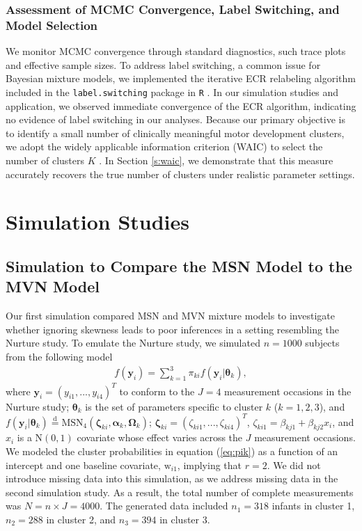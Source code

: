 \documentclass[useAMS,usenatbib,referee]{biom}
\begin{document}
\subsubsection{Assessment of MCMC Convergence, Label Switching, and Model Selection}
\label{s:mcmcmisc}
We monitor MCMC convergence through standard diagnostics, such trace plots and effective sample sizes. To address label switching, a common issue for Bayesian mixture models, we implemented the iterative ECR relabeling algorithm included in the \texttt{label.switching} package in \texttt{R} \citep{papastamoulis2015label}. In our simulation studies and application, we observed immediate convergence of the ECR algorithm, indicating no evidence of label switching in our analyses. Because our primary objective is to identify a small number of clinically meaningful motor development clusters, we adopt the widely applicable information criterion (WAIC) to select the number of clusters $K$ \citep{watanabe2010asymptotic}. In Section \ref{s:waic}, we demonstrate that this measure accurately recovers the true number of clusters under realistic parameter settings.

\section{Simulation Studies}
\label{s:sim}

\subsection{Simulation to Compare the MSN Model to the MVN Model}
Our first simulation compared MSN and MVN mixture models to investigate whether ignoring skewness leads to poor inferences in a setting resembling the Nurture study. To emulate the Nurture study, we simulated $n = 1000$ subjects from the following model
\begin{eqnarray}
	\label{eq:sim1}
	f(\mathbf{y}_i) = \sum_{k = 1}^3 \pi_{ki} f(\mathbf{y}_i | \boldsymbol\theta_k),
\end{eqnarray}
where $\mathbf{y}_i = (y_{i1},...,y_{i4})^T$ to conform to the $J = 4$ measurement occasions in the Nurture study; $\boldsymbol\theta_k$ is the set of parameters specific to cluster $k$ ($k = 1,2,3$), and $f(\mathbf{y}_i | \boldsymbol\theta_k) \stackrel{\text{d}}{=} \text{MSN}_4(\boldsymbol\zeta_{ki},\boldsymbol\alpha_k,\boldsymbol\Omega_k)$; $\boldsymbol\zeta_{ki} = (\zeta_{ki1},...,\zeta_{ki4})^T$, $\zeta_{ki1}=\beta_{kj1} + \beta_{kj2}x_i$, and $x_i$ is a N$(0,1)$ covariate whose effect varies across the $J$ measurement occasions. We modeled the cluster probabilities in equation (\ref{eq:pik}) as a function of an intercept and one baseline covariate, $\text{w}_{i1}$, implying that $r = 2$. We did not introduce missing data into this simulation, as we address missing data in the second simulation study. As a result, the total number of complete measurements was $N = n \times J = 4000$. The generated data included $n_1=318$ infants in cluster 1, $n_2=288$ in cluster 2, and $n_3=394$ in cluster 3.
\end{document}
